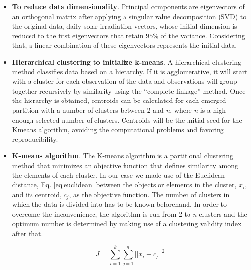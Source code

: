 \begin{itemize}
\item \textbf{To reduce data dimensionality}. Principal components are eigenvectors of an orthogonal matrix after applying a singular value decomposition (SVD) to the original data, daily solar irradiation vectors, whose initial dimension is reduced to the first eigenvectors that retain $95\%$ of the variance. Considering that, a linear combination of these eigenvectors represents the initial data.
\item \textbf{Hierarchical clustering to initialize k-means}. A hierarchical clustering method classifies data based on a hierarchy. If it is agglomerative, it will start with a cluster for each observation of the data and observations will group together recursively by similarity using the “complete linkage” method. Once the hierarchy is obtained, centroids can be calculated for each emerged partition with a number of clusters between 2 and \textit{n}, where \textit{n} is a high enough selected number of clusters. Centroids will be the initial seed for the Kmeans algorithm, avoiding the computational problems and favoring reproducibility.
\item \textbf{K-means algorithm}. The K-means algorithm is a partitional clustering method that minimizes an objective function that defines similarity among the elements of each cluster. In our case we made use of the Euclidean distance, Eq. \ref{eq:euclidean} between the objects or elements in the cluster, $x_{i}$, and its centroid, $c_{j}$, as the objective function. The number of clusters in which the data is divided into has to be known beforehand. In order to overcome the inconvenience, the algorithm is run from 2 to \textit{n} clusters and the optimum number is determined by making use of a clustering validity index after that.

\begin{equation}\label{eq:euclidean}
    J =\sum_{i=1}^{k}\sum_{j=1}^{n}{||x_i-c_j||}^2
\end{equation}



\end{itemize}
